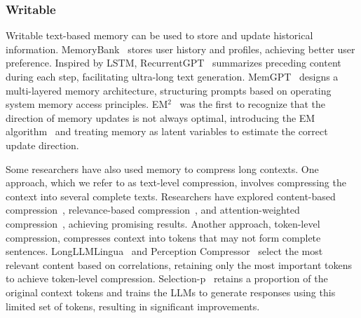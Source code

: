 \subsubsection{Writable}\label{sec4_4}

Writable text-based memory can be used to store and update historical information. MemoryBank~\citep{zhong2024memorybank} stores user history and profiles, achieving better user preference. Inspired by LSTM, RecurrentGPT~\citep{zhou2023recurrentgpt} summarizes preceding content during each step, facilitating ultra-long text generation. MemGPT~\citep{packer2023memgpt} designs a multi-layered memory architecture, structuring prompts based on operating system memory access principles. EM$^2$~\citep{yin2024explicit} was the first to recognize that the direction of memory updates is not always optimal, introducing the EM algorithm~\citep{dempster1977maximum} and treating memory as latent variables to estimate the correct update direction.

Some researchers have also used memory to compress long contexts. One approach, which we refer to as text-level compression, involves compressing the context into several complete texts. Researchers have explored content-based compression~\citep{fei2023extending}, relevance-based compression~\citep{yoon2024compact}, and attention-weighted compression~\citep{choi2024reading}, achieving promising results. Another approach, token-level compression, compresses context into tokens that may not form complete sentences. LongLLMLingua~\citep{jiang2023longllmlingua} and Perception Compressor~\citep{tang2024perception} select the most relevant content based on correlations, retaining only the most important tokens to achieve token-level compression. Selection-p~\citep{chung2024selection} retains a proportion of the original context tokens and trains the LLMs to generate responses using this limited set of tokens, resulting in significant improvements.